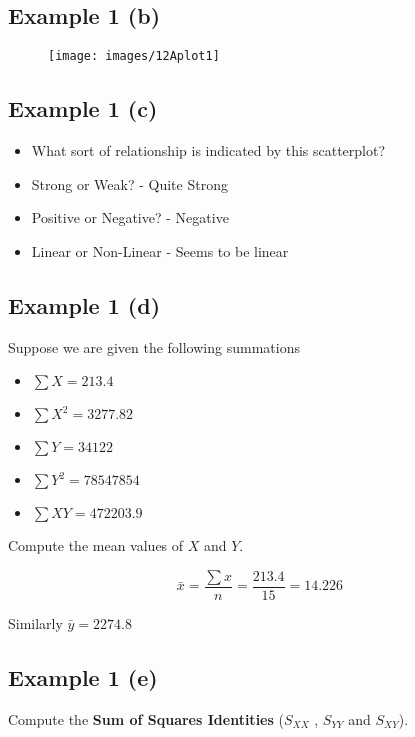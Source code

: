 \documentclass[]{report}
\begin{document}

\subsection{Example 1 (b)}

\begin{figure}
	\texttt{[image: images/12Aplot1]}\\
\end{figure}



\subsection{Example 1 (c)}
\begin{itemize}
	\item What sort of relationship is indicated by this scatterplot?
	\item Strong or Weak?  - Quite Strong
	\item Positive or Negative?  - Negative
	\item Linear or Non-Linear - Seems to be linear
\end{itemize}


\subsection{Example 1 (d)}
Suppose we are given the following summations
\begin{itemize}
	\item $\sum X = 213.4$
	\item $\sum X^2 =3277.82$
	\item $\sum Y = 34122$
	\item $\sum Y^2 = 78547854$
	\item $\sum XY = 472203.9$
\end{itemize}
Compute the mean values of $X$ and $Y$.

\[ \bar{x} = \frac{\sum x}{n} = \frac{213.4}{15} = 14.226 \]

Similarly $\bar{y} =  2274.8$



\subsection{Example 1 (e)}
Compute the \textbf{Sum of Squares Identities} ($S_{XX}$ , $S_{YY}$ and $S_{XY}$).\\
\end{document}
